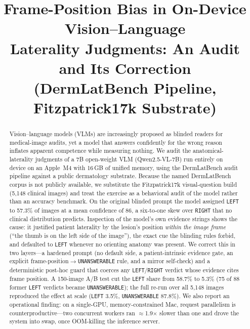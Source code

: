 \documentclass[conference]{IEEEtran}
\begin{document}
\title{Frame-Position Bias in On-Device Vision--Language\\ Laterality Judgments: An Audit and Its Correction\\(DermLatBench Pipeline, Fitzpatrick17k Substrate)}

\author{
}

\maketitle

\begin{abstract}
Vision--language models (VLMs) are increasingly proposed as blinded readers for medical-image audits, yet a model that answers confidently for the wrong reason inflates apparent competence while measuring nothing. We audit the anatomical-laterality judgments of a 7B open-weight VLM (Qwen2.5-VL-7B) run entirely on device on an Apple~M4 with 16\,GB of unified memory, using the DermLatBench audit pipeline against a public dermatology substrate. Because the named DermLatBench corpus is not publicly available, we substitute the Fitzpatrick17k visual-question build (5{,}148 clinical images) and treat the exercise as a behavioral audit of the model rather than an accuracy benchmark. On the original blinded prompt the model assigned \texttt{LEFT} to 57.3\% of images at a mean confidence of 86, a six-to-one skew over \texttt{RIGHT} that no clinical distribution predicts. Inspection of the model's own evidence strings shows the cause: it justified patient laterality by the lesion's position \emph{within the image frame} (``the thumb is on the left side of the image''), the exact cue the blinding rules forbid, and defaulted to \texttt{LEFT} whenever no orienting anatomy was present. We correct this in two layers---a hardened prompt (no default side, a patient-intrinsic evidence gate, an explicit frame-position$\rightarrow$\texttt{UNANSWERABLE} rule, and a mirror self-check) and a deterministic post-hoc guard that coerces any \texttt{LEFT}/\texttt{RIGHT} verdict whose evidence cites frame position. A 150-image A/B test cut the \texttt{LEFT} share from 58.7\% to 5.3\% (75 of 88 former \texttt{LEFT} verdicts became \texttt{UNANSWERABLE}); the full re-run over all 5{,}148 images reproduced the effect at scale (\texttt{LEFT} 3.5\%, \texttt{UNANSWERABLE} 87.8\%). We also report an operational finding: on a single-GPU, memory-constrained Mac, request parallelism is counterproductive---two concurrent workers ran $\approx$1.9$\times$ slower than one and drove the system into swap, once OOM-killing the inference server.
\end{abstract}
\end{document}
